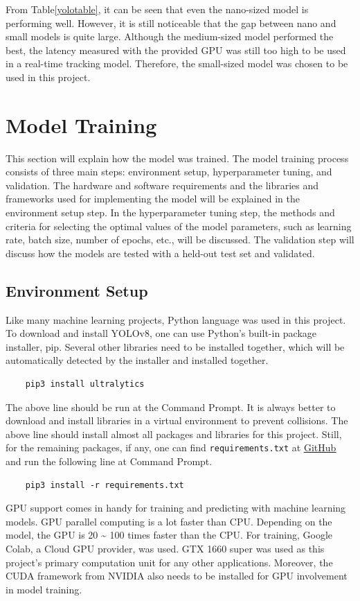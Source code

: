 From Table\ref{yolotable}, it can be seen that even the nano-sized model is performing well. However, it is still noticeable that the gap between nano and small models is quite large. Although the medium-sized model performed the best, the latency measured with the provided GPU was still too high to be used in a real-time tracking model. Therefore, the small-sized model was chosen to be used in this project. 

\newpage
\section{Model Training}
This section will explain how the model was trained. The model training process consists of three main steps: environment setup, hyperparameter tuning, and validation. The hardware and software requirements and the libraries and frameworks used for implementing the model will be explained in the environment setup step. In the hyperparameter tuning step, the methods and criteria for selecting the optimal values of the model parameters, such as learning rate, batch size, number of epochs, etc., will be discussed. The validation step will discuss how the models are tested with a held-out test set and validated.

\subsection{Environment Setup}
Like many machine learning projects, Python language was used in this project. To download and install YOLOv8, one can use Python's built-in package installer, pip. Several other libraries need to be installed together, which will be automatically detected by the installer and installed together. 
\begin{verbatim}
    pip3 install ultralytics
\end{verbatim}
The above line should be run at the Command Prompt. It is always better to download and install libraries in a virtual environment to prevent collisions. The above line should install almost all packages and libraries for this project. Still, for the remaining packages, if any, one can find \verb|requirements.txt| at \href{https://github.com/rladntjr7/FYP}{\underline{GitHub}} and run the following line at Command Prompt.
\begin{verbatim}
    pip3 install -r requirements.txt
\end{verbatim}

GPU support comes in handy for training and predicting with machine learning models. GPU parallel computing is a lot faster than CPU. Depending on the model, the GPU is 20 \~{} 100 times faster than the CPU. For training, Google Colab, a Cloud GPU provider, was used. GTX 1660 super was used as this project's primary computation unit for any other applications. Moreover, the CUDA framework from NVIDIA also needs to be installed for GPU involvement in model training. 
\newpage
